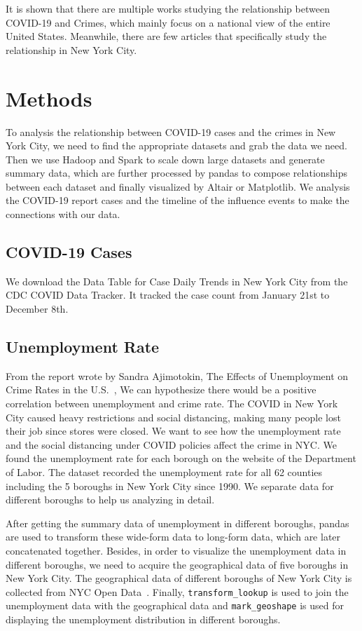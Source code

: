 \documentclass[conference]{IEEEtran}
\begin{document}
It is shown that there are multiple works studying the relationship between COVID-19 and Crimes, which mainly focus on a national view of the entire United States. Meanwhile, there are few articles that specifically study the relationship in New York City.

\section{Methods}
To analysis the relationship between COVID-19 cases and the crimes in New York City, we need to find the appropriate datasets and grab the data we need. Then we use Hadoop and Spark to scale down large datasets and generate summary data, which are further processed by pandas to compose relationships between each dataset and finally visualized by Altair or Matplotlib. We analysis the COVID-19 report cases and the timeline of the influence events to make the connections with our data.

\subsection{COVID-19 Cases}
We download the Data Table for Case Daily Trends in New York City from the CDC COVID Data Tracker. It tracked the case count from January 21st to December 8th. 

\subsection{Unemployment Rate}
From the report wrote by Sandra Ajimotokin, The Effects of Unemployment on Crime Rates in the U.S.~\cite{ajimotokin2015effects}, We can hypothesize there would be a positive correlation between unemployment and crime rate. The COVID in New York City caused heavy restrictions and social distancing, making many people lost their job since stores were closed. We want to see how the unemployment rate and the social distancing under COVID policies affect the crime in NYC. We found the unemployment rate for each borough on the website of the Department of Labor. The dataset recorded the unemployment rate for all 62 counties including the 5 boroughs in New York City since 1990. We separate data for different boroughs to help us analyzing in detail.

After getting the summary data of unemployment in different boroughs, pandas are used to transform these wide-form data to long-form data, which are later concatenated together. Besides, in order to visualize the unemployment data in different boroughs, we need to acquire the geographical data of five boroughs in New York City. The geographical data of different boroughs of New York City is collected from NYC Open Data~\cite{nyc2020boroughboundaries}. Finally, \verb|transform_lookup| is used to join the unemployment data with the geographical data and \verb|mark_geoshape| is used for displaying the unemployment distribution in different boroughs.
\end{document}
